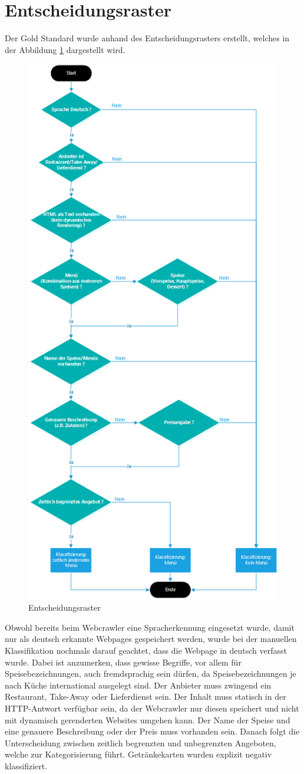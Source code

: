 \section{Entscheidungsraster}
Der Gold Standard wurde anhand des Entscheidungsrasters erstellt, welches in der Abbildung \cref{fig:classificationtree} dargestellt wird.
\begin{figure}[H]	
	\includegraphics[width=0.65\columnwidth,keepaspectratio]{img/man-classification-tree.png}
	\caption{Entscheidungsraster}
	\label{fig:classificationtree}
\end{figure}
Obwohl bereits beim Webcrawler eine Spracherkennung eingesetzt wurde, damit nur als deutsch erkannte Webpages gespeichert werden, wurde bei der manuellen Klassifikation nochmals darauf geachtet, dass die Webpage in deutsch verfasst wurde.
Dabei ist anzumerken, dass gewisse Begriffe, vor allem für Speisebezeichnungen, auch fremdsprachig sein dürfen, da Speisebezeichnungen je nach Küche international ausgelegt sind.
Der Anbieter muss zwingend ein Restaurant, Take-Away oder Lieferdienst sein.
Der Inhalt muss statisch in der HTTP-Antwort verfügbar sein, da der Webcrawler nur diesen speichert und nicht mit dynamisch gerenderten Websites umgehen kann.
Der Name der Speise und eine genauere Beschreibung oder der Preis muss vorhanden sein.
Danach folgt die Unterscheidung zwischen zeitlich begrenzten und unbegrenzten Angeboten, welche zur Kategorisierung führt.
Getränkekarten wurden explizit negativ klassifiziert.
